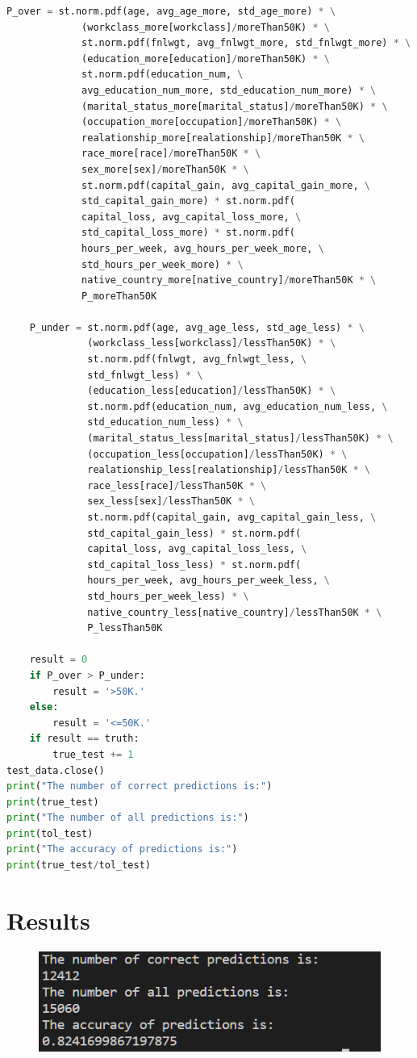 ﻿\documentclass[a4paper, 11pt]{article}
\begin{document}
\begin{lstlisting}[language=Python,frame=single]
    P_over = st.norm.pdf(age, avg_age_more, std_age_more) * \
             (workclass_more[workclass]/moreThan50K) * \
             st.norm.pdf(fnlwgt, avg_fnlwgt_more, std_fnlwgt_more) * \
             (education_more[education]/moreThan50K) * \
             st.norm.pdf(education_num, \
             avg_education_num_more, std_education_num_more) * \
             (marital_status_more[marital_status]/moreThan50K) * \
             (occupation_more[occupation]/moreThan50K) * \
             realationship_more[realationship]/moreThan50K * \
             race_more[race]/moreThan50K * \
             sex_more[sex]/moreThan50K * \
             st.norm.pdf(capital_gain, avg_capital_gain_more, \
             std_capital_gain_more) * st.norm.pdf(
             capital_loss, avg_capital_loss_more, \
             std_capital_loss_more) * st.norm.pdf(
             hours_per_week, avg_hours_per_week_more, \
             std_hours_per_week_more) * \
             native_country_more[native_country]/moreThan50K * \
             P_moreThan50K

    P_under = st.norm.pdf(age, avg_age_less, std_age_less) * \
              (workclass_less[workclass]/lessThan50K) * \
              st.norm.pdf(fnlwgt, avg_fnlwgt_less, \
              std_fnlwgt_less) * \
              (education_less[education]/lessThan50K) * \
              st.norm.pdf(education_num, avg_education_num_less, \
              std_education_num_less) * \
              (marital_status_less[marital_status]/lessThan50K) * \
              (occupation_less[occupation]/lessThan50K) * \
              realationship_less[realationship]/lessThan50K * \
              race_less[race]/lessThan50K * \
              sex_less[sex]/lessThan50K * \
              st.norm.pdf(capital_gain, avg_capital_gain_less, \
              std_capital_gain_less) * st.norm.pdf(
              capital_loss, avg_capital_loss_less, \
              std_capital_loss_less) * st.norm.pdf(
              hours_per_week, avg_hours_per_week_less, \
              std_hours_per_week_less) * \
              native_country_less[native_country]/lessThan50K * \
              P_lessThan50K

    result = 0
    if P_over > P_under:
        result = '>50K.'
    else:
        result = '<=50K.'
    if result == truth:
        true_test += 1
test_data.close()
print("The number of correct predictions is:")
print(true_test)
print("The number of all predictions is:")
print(tol_test)
print("The accuracy of predictions is:")
print(true_test/tol_test)


\end{lstlisting}
\section{Results}
\begin{figure}[h]
  \centering

  \includegraphics[width=14cm]{result.png}
\end{figure}
%
%
\end{document}
